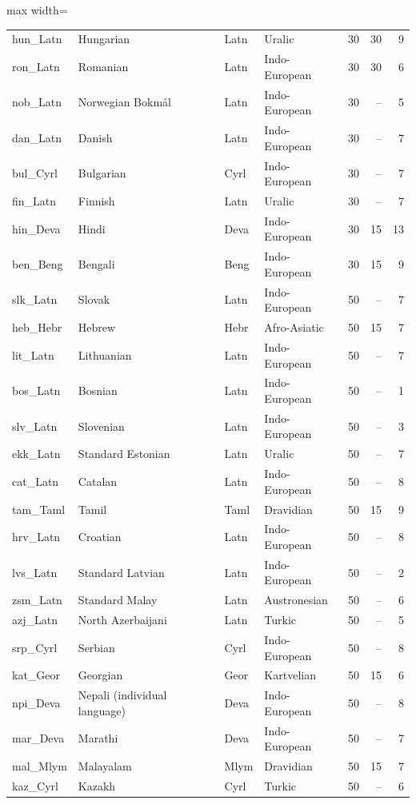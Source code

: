\begin{table}[p]
\begin{minipage}[t]{0.49\textwidth}
\begin{adjustbox}{max width=\linewidth}
\begin{tabular}[t]{llllrrr}
hun\_Latn & Hungarian & Latn & Uralic & 30 & 30 & 9 \\
ron\_Latn & Romanian & Latn & Indo-European & 30 & 30 & 6 \\
nob\_Latn & Norwegian Bokmål & Latn & Indo-European & 30 & -- & 5 \\
dan\_Latn & Danish & Latn & Indo-European & 30 & -- & 7 \\
bul\_Cyrl & Bulgarian & Cyrl & Indo-European & 30 & -- & 7 \\
fin\_Latn & Finnish & Latn & Uralic & 30 & -- & 7 \\
hin\_Deva & Hindi & Deva & Indo-European & 30 & 15 & 13 \\
ben\_Beng & Bengali & Beng & Indo-European & 30 & 15 & 9 \\
slk\_Latn & Slovak & Latn & Indo-European & 50 & -- & 7 \\
heb\_Hebr & Hebrew & Hebr & Afro-Asiatic & 50 & 15 & 7 \\
lit\_Latn & Lithuanian & Latn & Indo-European & 50 & -- & 7 \\
bos\_Latn & Bosnian & Latn & Indo-European & 50 & -- & 1 \\
slv\_Latn & Slovenian & Latn & Indo-European & 50 & -- & 3 \\
ekk\_Latn & Standard Estonian & Latn & Uralic & 50 & -- & 7 \\
cat\_Latn & Catalan & Latn & Indo-European & 50 & -- & 8 \\
tam\_Taml & Tamil & Taml & Dravidian & 50 & 15 & 9 \\
hrv\_Latn & Croatian & Latn & Indo-European & 50 & -- & 8 \\
lvs\_Latn & Standard Latvian & Latn & Indo-European & 50 & -- & 2 \\
zsm\_Latn & Standard Malay & Latn & Austronesian & 50 & -- & 6 \\
azj\_Latn & North Azerbaijani & Latn & Turkic & 50 & -- & 5 \\
srp\_Cyrl & Serbian & Cyrl & Indo-European & 50 & -- & 8 \\
kat\_Geor & Georgian & Geor & Kartvelian & 50 & 15 & 6 \\
npi\_Deva & Nepali (individual language) & Deva & Indo-European & 50 & -- & 8 \\
mar\_Deva & Marathi & Deva & Indo-European & 50 & -- & 7 \\
mal\_Mlym & Malayalam & Mlym & Dravidian & 50 & 15 & 7 \\
kaz\_Cyrl & Kazakh & Cyrl & Turkic & 50 & -- & 6 \\

\end{tabular}
\end{adjustbox}
\end{minipage}
\end{table}
